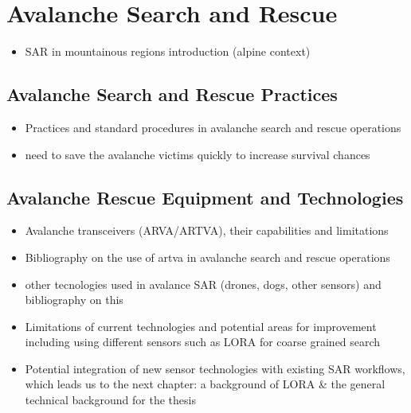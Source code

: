 \chapter{Avalanche Search and Rescue}

\begin{itemize}
\item SAR in mountainous regions introduction (alpine context)
\end{itemize}

\section{Avalanche Search and Rescue Practices}
\begin{itemize}
\item Practices and standard procedures in avalanche search and rescue operations
\item need to save the avalanche victims quickly to increase survival chances
\end{itemize}

\section{Avalanche Rescue Equipment and Technologies}
\begin{itemize}
\item Avalanche transceivers (ARVA/ARTVA), their capabilities and limitations
\item Bibliography on the use of artva in avalanche search and rescue operations
\item other tecnologies used in avalance SAR (drones, dogs, other sensors) and bibliography on this
\item Limitations of current technologies and potential areas for improvement including using different sensors such as LORA for coarse grained search
\item Potential integration of new sensor technologies with existing SAR workflows, which leads us to the next chapter: a background of LORA \& the general technical background for the thesis
\end{itemize}